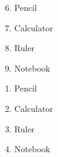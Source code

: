 \documentclass{article}
\begin{document}
\begin{enumerate}\setcounter{enumi}{5}
\item Pencil
\item Calculator
\item Ruler
\item Notebook
\end{enumerate}

\begin{enumerate}
\item[] Pencil
\item[] Calculator
\item[] Ruler
\item[] Notebook
\end{enumerate}
\end{document}
